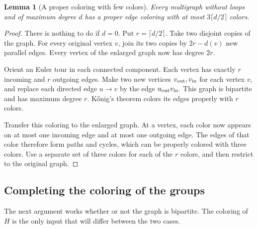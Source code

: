 \documentclass[11pt]{article}
\newtheorem{lemma}[theorem]{Lemma}
\theoremstyle{definition}\newtheorem{algorithm}{Algorithm}[section]
\numberwithin{equation}{section}
\theoremstyle{remark}\newtheorem*{remark}{Remark}
\begin{document}
\begin{lemma}[A proper coloring with few colors]\label{lem:three-per-two}
Every multigraph without loops and of maximum degree $d$ has a proper
edge coloring with at most $3\lceil d/2\rceil$ colors.
\end{lemma}
\begin{proof}
There is nothing to do if $d=0$. Put $r=\lceil d/2\rceil$.
Take two disjoint copies of the graph. For every original vertex $v$,
join its two copies by $2r-d(v)$ new parallel edges. Every vertex of
the enlarged graph now has degree $2r$.

Orient an Euler tour in each connected component. Each vertex has
exactly $r$ incoming and $r$ outgoing edges. Make two new vertices
$v_{\rm out},v_{\rm in}$ for each vertex $v$, and replace each directed
edge $u\to v$ by the edge $u_{\rm out}v_{\rm in}$. This graph is
bipartite and has maximum degree $r$. K\H{o}nig's theorem colors its
edges properly with $r$ colors.

Transfer this coloring to the enlarged graph. At a vertex, each color
now appears on at most one incoming edge and at most one outgoing edge.
The edges of that color therefore form paths and cycles, which can be
properly colored with three colors. Use a separate set of three colors
for each of the $r$ colors, and then restrict to the original graph.
\end{proof}

\subsection{Completing the coloring of the groups}
The next argument works whether or not the graph is bipartite. The
coloring of $H$ is the only input that will differ between the two cases.
\end{document}
